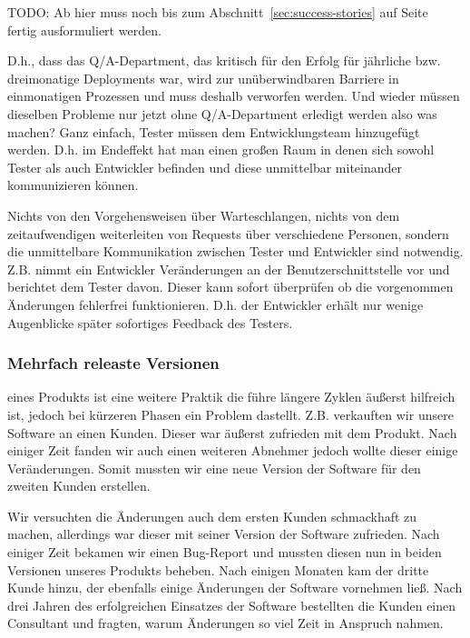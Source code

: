 \begin{wichtigbox}
TODO: Ab hier muss noch bis zum Abschnitt~\ref{sec:success-stories} auf
Seite~\pageref{sec:success-stories} fertig ausformuliert werden.
\end{wichtigbox}

D.h., dass das Q/A-Department, das kritisch für den Erfolg für jährliche bzw.
dreimonatige Deployments war, wird zur unüberwindbaren Barriere in
einmonatigen Prozessen und muss deshalb verworfen werden. Und wieder müssen
dieselben Probleme nur jetzt ohne Q/A-Department erledigt werden also was
machen? Ganz einfach, Tester müssen dem Entwicklungsteam hinzugefügt werden.
D.h. im Endeffekt hat man einen großen Raum in denen sich sowohl Tester als
auch Entwickler befinden und diese unmittelbar miteinander kommunizieren
können.

Nichts von den Vorgehensweisen über Warteschlangen, nichts von dem
zeitaufwendigen weiterleiten von Requests über verschiedene Personen, sondern
die unmittelbare Kommunikation zwischen Tester und Entwickler sind notwendig.
Z.B. nimmt ein Entwickler Veränderungen an der Benutzerschnittstelle vor und
berichtet dem Tester davon. Dieser kann sofort überprüfen ob die vorgenommen
Änderungen fehlerfrei funktionieren. D.h. der Entwickler erhält nur wenige
Augenblicke später sofortiges Feedback des Testers.

\subsubsection{Mehrfach releaste Versionen}
eines Produkts ist eine weitere Praktik die führe längere Zyklen äußerst
hilfreich ist, jedoch bei kürzeren Phasen ein Problem dastellt. Z.B.
verkauften wir unsere Software an einen Kunden. Dieser war äußerst zufrieden
mit dem Produkt.  Nach einiger Zeit fanden wir auch einen weiteren Abnehmer
jedoch wollte dieser einige Veränderungen. Somit mussten wir eine neue Version
der Software für den zweiten Kunden erstellen.

Wir versuchten die Änderungen auch dem ersten Kunden schmackhaft zu machen,
allerdings war dieser mit seiner Version der Software zufrieden. Nach einiger
Zeit bekamen wir einen Bug-Report und mussten diesen nun in beiden Versionen
unseres Produkts beheben. Nach einigen Monaten kam der dritte Kunde hinzu, der
ebenfalls einige Änderungen der Software vornehmen ließ. Nach drei Jahren des
erfolgreichen Einsatzes der Software bestellten die Kunden einen Consultant
und fragten, warum Änderungen so viel Zeit in Anspruch nahmen.

